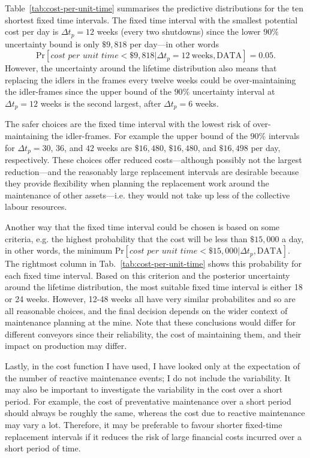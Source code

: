Table~\ref{tab:cost-per-unit-time} summarises the predictive distributions for the ten shortest fixed time intervals. 
The fixed time interval with the smallest potential cost per day is $\Delta t_p = 12$ weeks (every two shutdowns) since the lower $90\%$ uncertainty bound is only $\$9,818$ per day---in other words 
\begin{equation*}
 \text{Pr}\left[\textit{cost per unit time} < \$9,818 | \Delta t_p = 12 \: \text{weeks}, \text{DATA} \right] = 0.05.
\end{equation*}
However, the uncertainty around the lifetime distribution also means that replacing the idlers in the frames every twelve weeks could be over-maintaining the idler-frames since the upper bound of the $90\%$ uncertainty interval at $\Delta t_p = 12$ weeks is the second largest, after $\Delta t_p = 6$ weeks.



The safer choices are the fixed time interval with the lowest risk of over-maintaining the idler-frames. For example the upper bound of the $90\%$ intervals for $\Delta t_p = 30$, $36$, and $42$ weeks are $\$16,480$, $\$16,480$, and $\$16,498$ per day, respectively. These choices offer reduced costs---although possibly not the largest reduction---and the reasonably large replacement intervals are desirable because they provide flexibility when planning the replacement work around the maintenance of other assets---i.e. they would not take up less of the collective labour resources.

Another way that the fixed time interval could be chosen is based on some criteria, e.g. the highest probability that the cost will be less than $\$15,000$ a day, in other words, the minimum $\text{Pr}\left[\textit{cost per unit time} < \$15,000 | \Delta t_p, \text{DATA} \right]$. The rightmost column in Tab.~\ref{tab:cost-per-unit-time} shows this probability for each fixed time interval. Based on this criterion and the posterior uncertainty around the lifetime distribution, the most suitable fixed time interval is either 18 or 24 weeks. However, 12-48 weeks all have very similar probabilites and so are all reasonable choices, and the final decision depends on the wider context of maintenance planning at the mine. Note that these conclusions would differ for different conveyors since their reliability, the cost of maintaining them, and their impact on production may differ. 

Lastly, in the cost function I have used, I have looked only at the expectation of the number of reactive maintenance events; I do not include the variability. It may also be important to investigate the variability in the cost over a short period. For example, the cost of preventative maintenance over a short period should always be roughly the same, whereas the cost due to reactive maintenance may vary a lot. Therefore, it may be preferable to favour shorter fixed-time replacement intervals if it reduces the risk of large financial costs incurred over a short period of time.

